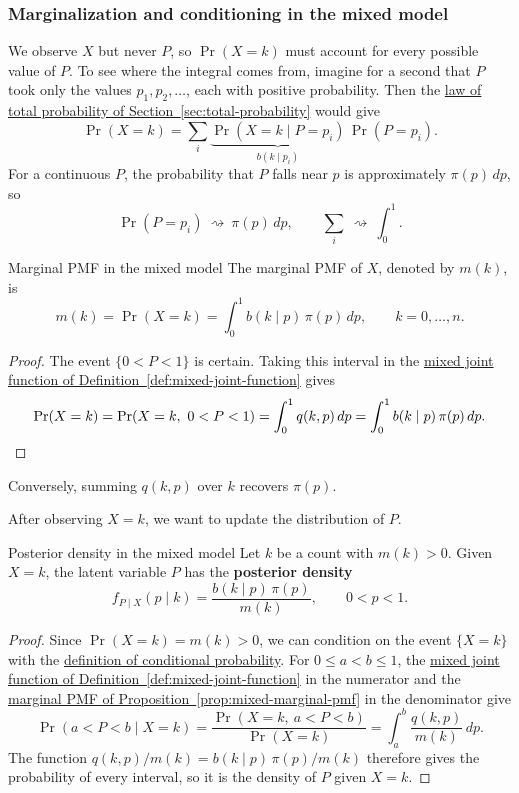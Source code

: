 \documentclass[a4paper,12pt,oneside]{report}
\begin{document}
\subsubsection{Marginalization and conditioning in the mixed model}
We observe $X$ but never $P$, so $\Pr(X=k)$ must account for every
possible value of $P$. To see where the integral comes from,
imagine for a second that $P$ took only the values
$p_1,p_2,\ldots$, each with positive probability. Then the
\hyperref[sec:total-probability]{law of total probability of
Section~\ref{sec:total-probability}} would give
\[
  \Pr(X=k)=\sum_i
    \underbrace{\Pr(X=k\mid P=p_i)}_{b(k\mid p_i)}\,\Pr(P=p_i).
\]
For a continuous $P$, the probability that $P$ falls near $p$ is
approximately $\pi(p)\,dp$, so
\[
  \Pr(P=p_i)\ \rightsquigarrow\ \pi(p)\,dp,
  \qquad
  \sum_i\ \rightsquigarrow\ \int_0^1.
\]

\begin{framedprop}{Marginal PMF in the mixed model}
\label{prop:mixed-marginal-pmf}
The marginal PMF of $X$, denoted by $m(k)$, is
\[
  m(k)=\Pr(X=k)=\int_0^1 b(k\mid p)\,\pi(p)\,dp,
  \qquad k=0,\ldots,n.
\]
\end{framedprop}
\begin{proof}
The event $\{0<P<1\}$ is certain. Taking this interval in the
\hyperref[def:mixed-joint-function]{mixed joint function of
Definition~\ref{def:mixed-joint-function}}
gives
\[
  \Pr(X=k)=\Pr(X=k,\ 0<P<1)=\int_0^1 q(k,p)\,dp
    =\int_0^1 b(k\mid p)\,\pi(p)\,dp.
  \qedhere
\]
\end{proof}

Conversely, summing $q(k,p)$ over $k$ recovers $\pi(p)$.

After observing $X=k$, we want to update the distribution of $P$.

\begin{framedprop}{Posterior density in the mixed model}
\label{prop:mixed-posterior}
Let $k$ be a count with $m(k)>0$. Given $X=k$, the latent variable
$P$ has the \textbf{posterior density}
\[
  f_{P\mid X}(p\mid k)=\frac{b(k\mid p)\,\pi(p)}{m(k)},
  \qquad 0<p<1.
\]
\end{framedprop}
\begin{proof}
Since $\Pr(X=k)=m(k)>0$, we can condition on the event $\{X=k\}$
with the
\hyperref[def:conditional-probability]{definition of conditional
probability}. For $0\leq a<b\leq1$, the
\hyperref[def:mixed-joint-function]{mixed joint function of
Definition~\ref{def:mixed-joint-function}} in the numerator and the
\hyperref[prop:mixed-marginal-pmf]{marginal PMF of
Proposition~\ref{prop:mixed-marginal-pmf}} in the denominator give
\[
  \Pr(a<P<b\mid X=k)=\frac{\Pr(X=k,\ a<P<b)}{\Pr(X=k)}
  =\int_a^b \frac{q(k,p)}{m(k)}\,dp.
\]
The function $q(k,p)/m(k)=b(k\mid p)\,\pi(p)/m(k)$ therefore gives
the probability of every interval, so it is the density of $P$
given $X=k$.
\end{proof}
\end{document}
